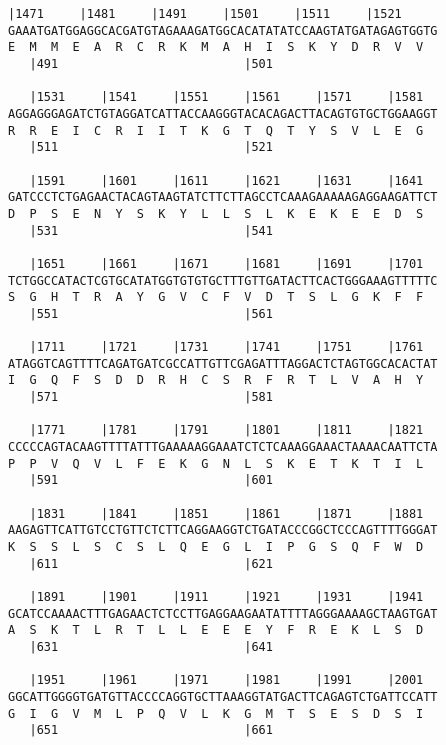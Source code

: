 \documentclass{article}
\begin{document}
\newpage
\begin{Verbatim}[fontfamily=courier]
   |1471     |1481     |1491     |1501     |1511     |1521  
GAAATGATGGAGGCACGATGTAGAAAGATGGCACATATATCCAAGTATGATAGAGTGGTG
E  M  M  E  A  R  C  R  K  M  A  H  I  S  K  Y  D  R  V  V  
   |491                          |501                       

   |1531     |1541     |1551     |1561     |1571     |1581  
AGGAGGGAGATCTGTAGGATCATTACCAAGGGTACACAGACTTACAGTGTGCTGGAAGGT
R  R  E  I  C  R  I  I  T  K  G  T  Q  T  Y  S  V  L  E  G  
   |511                          |521                       

   |1591     |1601     |1611     |1621     |1631     |1641  
GATCCCTCTGAGAACTACAGTAAGTATCTTCTTAGCCTCAAAGAAAAAGAGGAAGATTCT
D  P  S  E  N  Y  S  K  Y  L  L  S  L  K  E  K  E  E  D  S  
   |531                          |541                       

   |1651     |1661     |1671     |1681     |1691     |1701  
TCTGGCCATACTCGTGCATATGGTGTGTGCTTTGTTGATACTTCACTGGGAAAGTTTTTC
S  G  H  T  R  A  Y  G  V  C  F  V  D  T  S  L  G  K  F  F  
   |551                          |561                       

   |1711     |1721     |1731     |1741     |1751     |1761  
ATAGGTCAGTTTTCAGATGATCGCCATTGTTCGAGATTTAGGACTCTAGTGGCACACTAT
I  G  Q  F  S  D  D  R  H  C  S  R  F  R  T  L  V  A  H  Y  
   |571                          |581                       

   |1771     |1781     |1791     |1801     |1811     |1821  
CCCCCAGTACAAGTTTTATTTGAAAAAGGAAATCTCTCAAAGGAAACTAAAACAATTCTA
P  P  V  Q  V  L  F  E  K  G  N  L  S  K  E  T  K  T  I  L  
   |591                          |601                       

   |1831     |1841     |1851     |1861     |1871     |1881  
AAGAGTTCATTGTCCTGTTCTCTTCAGGAAGGTCTGATACCCGGCTCCCAGTTTTGGGAT
K  S  S  L  S  C  S  L  Q  E  G  L  I  P  G  S  Q  F  W  D  
   |611                          |621                       

   |1891     |1901     |1911     |1921     |1931     |1941  
GCATCCAAAACTTTGAGAACTCTCCTTGAGGAAGAATATTTTAGGGAAAAGCTAAGTGAT
A  S  K  T  L  R  T  L  L  E  E  E  Y  F  R  E  K  L  S  D  
   |631                          |641                       

   |1951     |1961     |1971     |1981     |1991     |2001  
GGCATTGGGGTGATGTTACCCCAGGTGCTTAAAGGTATGACTTCAGAGTCTGATTCCATT
G  I  G  V  M  L  P  Q  V  L  K  G  M  T  S  E  S  D  S  I  
   |651                          |661                       

\end{Verbatim}
\end{document}
